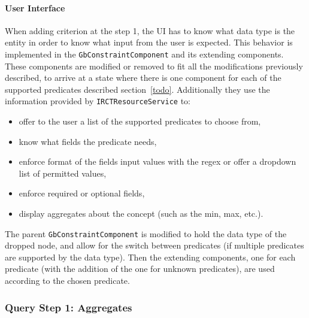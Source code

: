 \paragraph{User Interface}
When adding criterion at the step 1, the UI has to know what data type is the entity in order to know what input from the user is expected.
This behavior is implemented in the \verb|GbConstraintComponent| and its extending components.
These components are modified or removed to fit all the modifications previously described, to arrive at a state where there is one component for each of the supported predicates described section~\ref{todo}.
Additionally they use the information provided by \verb|IRCTResourceService| to:
\begin{itemize}
    \item offer to the user a list of the supported predicates to choose from,
    \item know what fields the predicate needs,
    \item enforce format of the fields input values with the regex or offer a dropdown list of permitted values, 
    \item enforce required or optional fields,
    \item display aggregates about the concept (such as the min, max, etc.).
\end{itemize}

The parent \verb|GbConstraintComponent| is modified to hold the data type of the dropped node, and allow for the switch between predicates (if multiple predicates are supported by the data type).
Then the extending components, one for each predicate (with the addition of the one for unknown predicates), are used according to the chosen predicate.


\subsubsection{Query Step 1: Aggregates}

